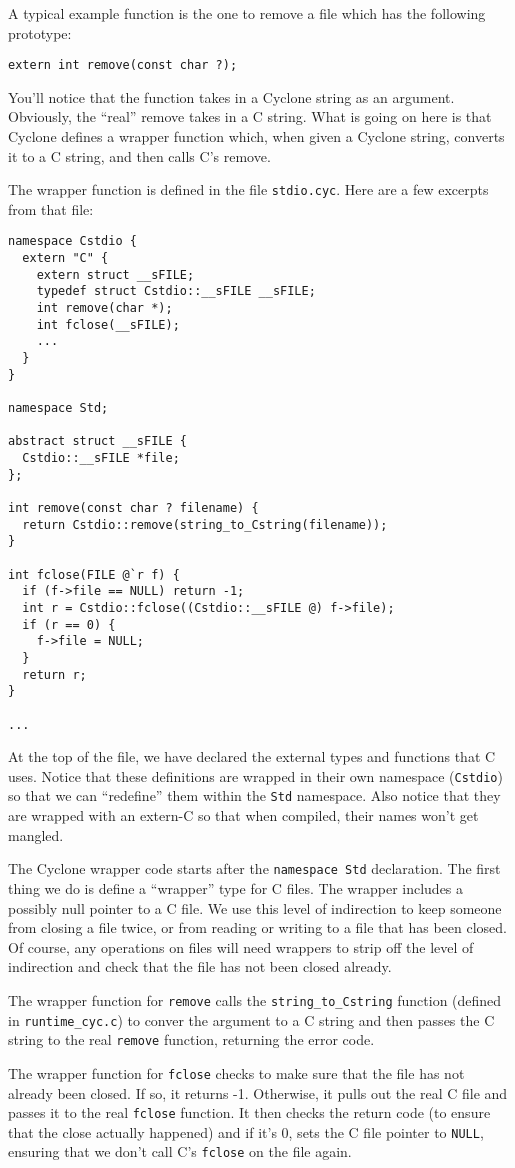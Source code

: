 A typical example function is the one to remove a file which
has the following prototype:
\begin{verbatim}
extern int remove(const char ?);
\end{verbatim}
You'll notice that the function takes in a Cyclone string
as an argument.  Obviously, the ``real'' remove takes in a
C string.  What is going on here is that Cyclone defines
a wrapper function which, when given a Cyclone string,
converts it to a C string, and then calls C's remove. 

The wrapper function is defined in the file \texttt{stdio.cyc}.
Here are a few excerpts from that file:
\begin{verbatim}
namespace Cstdio {
  extern "C" {
    extern struct __sFILE;
    typedef struct Cstdio::__sFILE __sFILE;
    int remove(char *);
    int fclose(__sFILE);
    ...
  }
}

namespace Std;

abstract struct __sFILE {
  Cstdio::__sFILE *file; 
};

int remove(const char ? filename) {
  return Cstdio::remove(string_to_Cstring(filename));
}

int fclose(FILE @`r f) {
  if (f->file == NULL) return -1;
  int r = Cstdio::fclose((Cstdio::__sFILE @) f->file);
  if (r == 0) {
    f->file = NULL;
  }
  return r;
}

...
\end{verbatim}
At the top of the file, we have declared the external types
and functions that C uses.  Notice that these definitions
are wrapped in their own namespace (\texttt{Cstdio}) so that
we can ``redefine'' them within the \texttt{Std} namespace.
Also notice that they are wrapped with an extern-C so that
when compiled, their names won't get mangled.

The Cyclone wrapper code starts after the \texttt{namespace Std}
declaration.  The first thing we do is define a ``wrapper''
type for C files.  The wrapper includes a possibly null pointer
to a C file.  We use this level of indirection to keep someone
from closing a file twice, or from reading or writing to a file
that has been closed.  Of course, any operations on files will
need wrappers to strip off the level of indirection and check
that the file has not been closed already.  

The wrapper function for \texttt{remove} calls the \texttt{string\_to\_Cstring}
function (defined in \texttt{runtime\_cyc.c}) to conver the
argument to a C string and then passes the C string to the
real \texttt{remove} function, returning the error code.

The wrapper function for \texttt{fclose} checks to make sure that
the file has not already been closed.  If so, it returns -1.
Otherwise, it pulls out the real C file and passes it to the
real \texttt{fclose} function.  It then checks the return code
(to ensure that the close actually happened) and if it's 0,
sets the C file pointer to \texttt{NULL}, ensuring that we
don't call C's \texttt{fclose} on the file again.  
